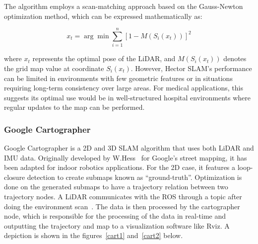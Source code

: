 \noindent The algorithm employs a scan-matching approach based on the Gauss-Newton optimization method, which can be expressed mathematically as:

\begin{equation}
x_t = \arg \min \sum_{i=1}^{n} {[1 - M{(S_i{(x_t)})}]}^2
\end{equation}

\noindent where $x_t$ represents the optimal pose of the LiDAR, and $M(S_i(x_t))$ denotes the grid map value at coordinate $S_i(x_t)$.
However, Hector SLAM's performance can be limited in environments with few geometric features or in situations requiring long-term consistency over large areas. For medical applications, this suggests its optimal use would be in well-structured hospital environments where regular updates to the map can be performed.


\newpage


\subsubsection{Google Cartographer}
Google Cartographer is a 2D and 3D SLAM algorithm that uses both LiDAR and IMU 
data. Originally developed by W.Hess~\cite{hess2021real} for Google's street mapping, it has
been adapted for indoor robotics applications. For the 2D case, it features a loop-closure detection to 
create submaps known as ``ground-truth''. Optimization is done on the generated submaps to have a trajectory
relation between two trajectory nodes. A LiDAR communicates with the ROS through a topic after doing the 
environment scan~\cite{ramadhan2021design}. The data is then processed by the cartographer node, which is responsible for the 
processing of the data in real-time and outputting the trajectory and map to a visualization software like Rviz. A 
depiction is shown in the figures~\ref{cart1} and~\ref{cart2} below.


\vspace{3em}

